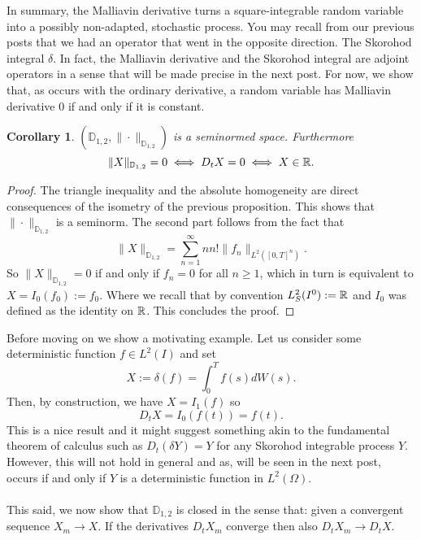 \documentclass[12pt]{article}
\newtheorem{corollary}{Corollary}
\begin{document}
In summary, the Malliavin derivative turns a square-integrable random variable into
a possibly non-adapted, stochastic process. You may recall from our previous posts that we had an operator that went in the opposite direction. The Skorohod integral $\delta $. In fact, the Malliavin derivative and the Skorohod integral are adjoint operators in a sense that will be made precise in the next post. For now, we show that, as occurs with the ordinary derivative, a random variable has Malliavin derivative $0$ if and only if it is constant.
\begin{corollary}
	$(\mathbb{D}_{1,2},\|\cdot \|_{\mathbb{D}_{1,2}})$ is a seminormed space. Furthermore
	\begin{equation*}
		\|X\|_{\mathbb{D}_{1,2}}=0 \iff D_tX=0\iff X\in {\mathbb R}.
	\end{equation*}
\end{corollary}
\begin{proof}
	The triangle inequality and the absolute homogeneity are direct consequences of the isometry of the previous proposition. This shows that $\|\cdot \|_{\mathbb{D}_{1,2}}$ is a seminorm. The second part follows from the fact that
	\begin{equation*}
		\|X\|_{\mathbb{D}_{1,2}}=\sum_{n=1}^{\infty} n n!\|f_{n}\|_{L^2([0,T]^n)}.	\end{equation*}
	So $\|X\|_{\mathbb{D}_{1,2}}=0$ if and only if  $f_n=0$ for all $n\geq 1$, which in turn is equivalent to  $X=I_0(f_0):=f_0$. Where we recall that by convention $L^2_{S}(I^0):={\mathbb R}$ and $I_0$ was defined as the identity on  ${\mathbb R}$.  This concludes the proof.
\end{proof}
Before moving on we show a motivating example. Let us consider some deterministic function $f\in L^2(I)$ and set $$X:=\delta(f)= \int_{0}^T f(s)dW(s).$$ Then, by construction, we have $X=I_1(f)$ so
\begin{equation*}
	D_t X= I_0(f(t))=f(t).
\end{equation*}
This is a nice result and it might suggest something akin to the fundamental theorem of calculus such as $D_t(\delta Y)=Y$ for any Skorohod integrable process $Y$. However, this will not hold in general and as, will be seen in the next post, occurs if and only if $Y$ is a deterministic function in $L^2(\Omega)$.\\\\
This said, we now show that $\mathbb{D}_{1,2}$ is closed in the sense that: given a convergent sequence $X_m\to X$. If the derivatives  $D_tX_m$ converge then also $D_t X_m\to D_t X$.
\end{document}

